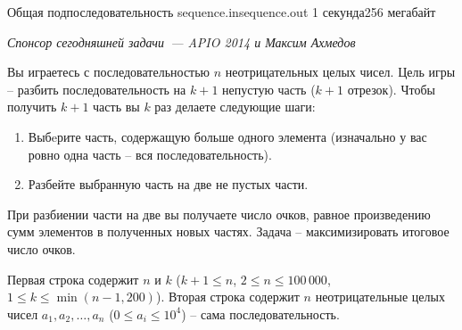 
\begin{problem}{Общая подпоследовательность}
{sequence.in}{sequence.out}
{1 секунда}{256 мегабайт}{}

\begin{flushright}
{\it
Спонсор сегодняшней задачи~--- APIO 2014 и Максим Ахмедов
}
\end{flushright}

Вы играетесь с последовательностью $n$ неотрицательных целых чисел.
Цель игры -- разбить последовательность на $k+1$ непустую часть ($k+1$ отрезок).
Чтобы получить $k+1$ часть вы $k$ раз делаете следующие шаги:

\begin{enumerate}
\item Выбeрите часть, содержащую больше одного элемента (изначально у вас ровно одна часть -- вся последовательность).
\item Разбейте выбранную часть на две не пустых части.
\end{enumerate}

При разбиении части на две вы получаете число очков, равное произведению сумм элементов в полученных новых частях.
Задача -- максимизировать итоговое число очков.


\InputFile

Первая строка содержит $n$ и $k$ ($k + 1 \le n$, $2 \le n \le 100\,000$, $1 \le k \le \min(n - 1, 200)$).
Вторая строка содержит $n$ неотрицательные целых чисел $a_1, a_2, \dots, a_n$ ($0 \le a_i \le 10^4$) -- сама последовательность.


\OutputFile


\end{problem}
